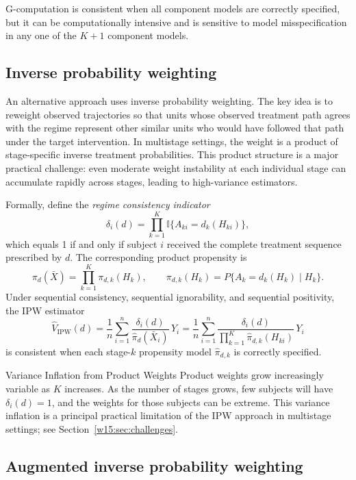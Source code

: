 \documentclass[master.tex]{subfiles}
\begin{document}
G-computation is consistent when all component models are correctly specified, but it can be computationally intensive and is sensitive to model misspecification in any one of the $K+1$ component models.

\subsection{Inverse probability weighting}
\label{w15:subsec:ipw}

An alternative approach uses inverse probability weighting. The key idea is to reweight observed trajectories so that units whose observed treatment path agrees with the regime represent other similar units who would have followed that path under the target intervention. In multistage settings, the weight is a product of stage-specific inverse treatment probabilities. This product structure is a major practical challenge: even moderate weight instability at each individual stage can accumulate rapidly across stages, leading to high-variance estimators.

Formally, define the \emph{regime consistency indicator}
\[
\delta_i(d)
= \prod_{k=1}^K \mathbb{I}\{A_{ki} = d_k(H_{ki})\},
\]
which equals 1 if and only if subject $i$ received the complete treatment sequence prescribed by $d$. The corresponding product propensity is
\[
\pi_d(\bar{X})
= \prod_{k=1}^K \pi_{d,k}(H_k),
\qquad
\pi_{d,k}(H_k) = P\{A_k = d_k(H_k) \mid H_k\}.
\]
Under sequential consistency, sequential ignorability, and sequential positivity, the IPW estimator
\[
\widehat{V}_{\mathrm{IPW}}(d)
= \frac{1}{n}\sum_{i=1}^n
\frac{\delta_i(d)}{\hat\pi_d(\bar{X}_i)}\,Y_i
= \frac{1}{n}\sum_{i=1}^n
\frac{\delta_i(d)}{\prod_{k=1}^K \hat\pi_{d,k}(H_{ki})}\,Y_i
\]
is consistent when each stage-$k$ propensity model $\hat\pi_{d,k}$ is correctly specified.

\begin{warn}{Variance Inflation from Product Weights}
Product weights grow increasingly variable as $K$ increases. As the number of stages grows, few subjects will have $\delta_i(d) = 1$, and the weights for those subjects can be extreme. This variance inflation is a principal practical limitation of the IPW approach in multistage settings; see Section~\ref{w15:sec:challenges}.
\end{warn}

\subsection{Augmented inverse probability weighting}
\label{w15:subsec:aipw}
\end{document}
